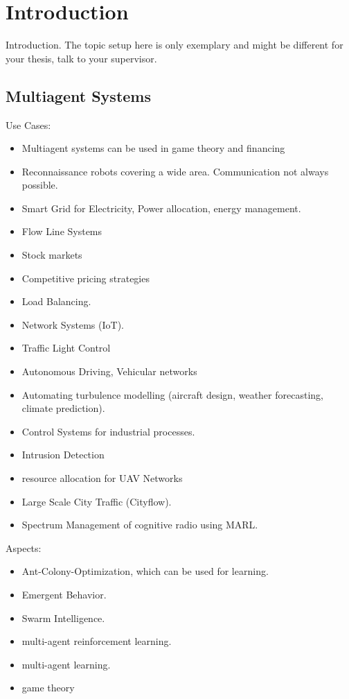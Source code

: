 
\chapter{Introduction}

Introduction. The topic setup here is only exemplary and might be different for your thesis, talk to your supervisor.

\section{Multiagent Systems}

Use Cases:
\begin{itemize}[noitemsep,nolistsep]
	\item Multiagent systems can be used in game theory and financing
	\item Reconnaissance robots covering a wide area. Communication not always possible.
	\item Smart Grid for Electricity, Power allocation, energy management.
	\item Flow Line Systems
	\item Stock markets
	\item Competitive pricing strategies
	\item Load Balancing.
	\item Network Systems (IoT).
	\item Traffic Light Control
	\item Autonomous Driving, Vehicular networks
	\item Automating turbulence modelling (aircraft design, weather forecasting, climate prediction).
	\item Control Systems for industrial processes.
	\item Intrusion Detection
	\item resource allocation for UAV Networks
	\item Large Scale City Traffic (Cityflow).
	\item Spectrum Management of cognitive radio using MARL.
\end{itemize}
Aspects:
\begin{itemize}[noitemsep,nolistsep]
	\item Ant-Colony-Optimization, which can be used for learning.
	\item Emergent Behavior.
	\item Swarm Intelligence.
	\item multi-agent reinforcement learning.
	\item multi-agent learning.
	\item game theory
\end{itemize}